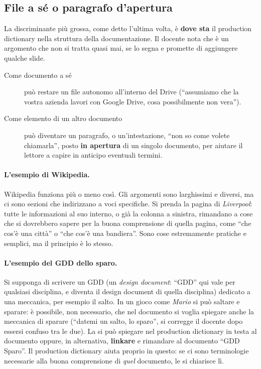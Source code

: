 \subsection{File a sé o paragrafo d'apertura}

La discriminante più grossa, come detto l'ultima volta, è \textbf{dove sta}
il production dictionary nella struttura della documentazione. Il docente
nota che è un argomento che non si tratta quasi mai, se lo segna e promette
di aggiungere qualche slide.
\begin{description}
  \item[Come documento a sé] può restare un file autonomo all'interno del
        Drive (``assumiamo che la vostra azienda lavori con Google Drive,
        cosa possibilmente non vera'').
  \item[Come elemento di un altro documento] può diventare un paragrafo, o
        un'intestazione, ``non so come volete chiamarla'', posto
        \textbf{in apertura} di un singolo documento, per aiutare il lettore
        a capire in anticipo eventuali termini.
\end{description}

\paragraph{L'esempio di Wikipedia.} Wikipedia funziona più o meno così. Gli
argomenti sono larghissimi e diversi, ma ci sono sezioni che indirizzano a
voci specifiche. Si prenda la pagina di \emph{Liverpool}: tutte le
informazioni al suo interno, o già la colonna a sinistra, rimandano a cose
che si dovrebbero sapere per la buona comprensione di quella pagina, come
``che cos'è una città'' o ``che cos'è una bandiera''. Sono cose estremamente
pratiche e semplici, ma il principio è lo stesso.

\paragraph{L'esempio del GDD dello sparo.} Si supponga di scrivere un GDD
(un \emph{design document}: ``GDD'' qui vale per qualsiasi disciplina, e
diventa il design document di quella disciplina) dedicato a una meccanica,
per esempio il salto. In un gioco come \emph{Mario} si può saltare e sparare:
è possibile, non necessario, che nel documento si voglia spiegare anche la
meccanica di sparare (``datemi un salto, lo sparo'', si corregge il docente
dopo essersi confuso tra le due). La si può spiegare nel production
dictionary in testa al documento oppure, in alternativa, \textbf{linkare} e
rimandare al documento ``GDD Sparo''. Il production dictionary aiuta proprio
in questo: se ci sono terminologie necessarie alla buona comprensione di
\emph{quel} documento, le si chiarisce lì.

